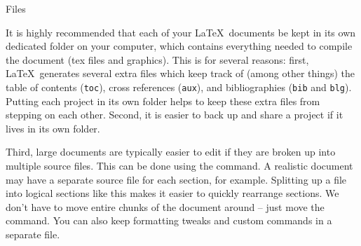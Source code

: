 \documentclass{article}
\begin{document}
\begin{center}
\Large Files
\end{center}

It is highly recommended that each of your \LaTeX\ documents be kept in its own dedicated folder on your computer, which contains everything needed to compile the document (tex files and graphics). This is for several reasons: first, \LaTeX\ generates several extra files which keep track of (among other things) the table of contents (\texttt{toc}), cross references (\texttt{aux}), and bibliographies (\texttt{bib} and \texttt{blg}). Putting each project in its own folder helps to keep these extra files from stepping on each other. Second, it is easier to back up and share a project if it lives in its own folder.

Third, large documents are typically easier to edit if they are broken up into multiple source files. This can be done using the \verb|| command. A realistic document may have a separate source file for each section, for example. Splitting up a file into logical sections like this makes it easier to quickly rearrange sections. We don't have to move entire chunks of the document around -- just move the \verb|| command. You can also keep formatting tweaks and custom commands in a separate file.
\end{document}
